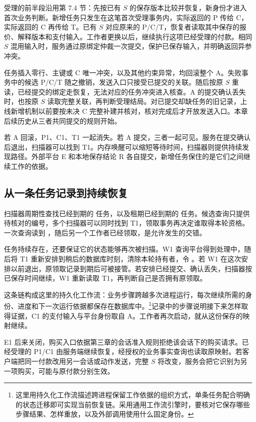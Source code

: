 受理的前半段沿用第 7.4 节：先按已有 \(S\) 的保存版本比较并恢复，新身份才进入首次业务判断。新增任务只发生在这笔首次受理事务内，实际返回的 P 传给 C，实际返回的 C 再传给 T。已有 \(S\) 对应原来的 P/C/T，恢复者读取其中保存的报价、解释版本和支付输入。工作者更换以后，继续执行这项已经受理的付款。相同 \(S\) 混用输入时，服务通过原绑定仲裁一次提交，保护已保存输入，并明确返回异参冲突。

任务插入零行、主键或 C 唯一冲突，以及其他约束异常，均回滚整个 A。失败事务中的候选 P/C/T 随之撤销，发送入口只接受已提交的关联。随后按原 \(S\) 重读，已经提交的绑定走恢复，无法对应的任务冲突进入核查。A 的提交确认丢失时，也按原 \(S\) 读取完整关联，再判断受理结局。对已提交却缺任务的旧记录，上线新增机制以前要按未决 C 完整补建并核对，核对完成后才开放发送入口。本章后续历史从三者共同提交的规则开始。


若 A 回滚，P1、C1、T1 一起消失。若 A 提交，三者一起可见。服务在提交确认后退出，扫描器可以找到 T1。内存唤醒可以缩短等待时间，扫描器则提供持续发现路径。外部平台 E 和本地保存结论 R 各自提交，新增任务保住的是它们之间继续工作的依据。

\subsection*{从一条任务记录到持续恢复}

扫描器周期性查找已经到期的  任务，以及租期已经到期的  任务。候选查询只提供待核对的编号，多个扫描器可以同时找到 T1，领取事务再决定谁取得本轮资格。一次查询读到 ，随后另一个工作者已经领取，是允许发生的交错。

任务持续存在，还要保证它的状态能够再次被扫描。W1 查询平台得到处理中，随后将 T1 重新安排到稍后的数据库时刻，清除本轮持有者，令 。若 W1 在这次安排以前退出，原领取记录到期后可被接管。若安排已经提交、确认丢失，扫描器按已保存时间继续，W1 重新读取 T1，再判断自己是否拥有原领取。

这条链构成这里的持久化工作流：业务步骤跨越多次进程运行，每次继续所需的身份、进度和下一次运行依据都保存在数据库中。\footnote{这里用持久化工作流描述跨进程保留工作依据的组织方式，单条任务配合明确的状态迁移即可实现当前恢复链。采用通用工作流引擎时，要核对它保存哪些步骤结果、怎样重放，以及外部调用使用什么固定身份。}记录中的步骤说明接下来怎样取得证据，C1 的支付输入与平台身份取自 A。工作者再次启动，就从这份保存的映射继续。

E1 后来关闭，购买入口依据第三章的会话准入规则拒绝该会话下的购买请求。已经受理的 P1/C1 由服务端继续恢复，经授权的业务事实查询也读取原映射。若客户端把同一付款改用另一会话或动作发送，完整 \(S\) 将改变，服务会把它识别为另一项购买，可能与原付款分别生效。

